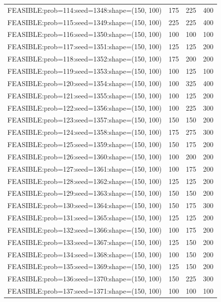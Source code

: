 \begin{longtable}{lccc}
FEASIBLE:prob=114:seed=1348:shape=(150, 100) &  175 &   225 &    400 \\
FEASIBLE:prob=115:seed=1349:shape=(150, 100) &  225 &   225 &    400 \\
FEASIBLE:prob=116:seed=1350:shape=(150, 100) &  100 &   100 &    100 \\
FEASIBLE:prob=117:seed=1351:shape=(150, 100) &  125 &   125 &    200 \\
FEASIBLE:prob=118:seed=1352:shape=(150, 100) &  175 &   200 &    200 \\
FEASIBLE:prob=119:seed=1353:shape=(150, 100) &  100 &   125 &    100 \\
FEASIBLE:prob=120:seed=1354:shape=(150, 100) &  100 &   325 &    400 \\
FEASIBLE:prob=121:seed=1355:shape=(150, 100) &  100 &   125 &    200 \\
FEASIBLE:prob=122:seed=1356:shape=(150, 100) &  100 &   225 &    300 \\
FEASIBLE:prob=123:seed=1357:shape=(150, 100) &  150 &   150 &    200 \\
FEASIBLE:prob=124:seed=1358:shape=(150, 100) &  175 &   275 &    300 \\
FEASIBLE:prob=125:seed=1359:shape=(150, 100) &  150 &   175 &    200 \\
FEASIBLE:prob=126:seed=1360:shape=(150, 100) &  100 &   200 &    200 \\
FEASIBLE:prob=127:seed=1361:shape=(150, 100) &  100 &   175 &    200 \\
FEASIBLE:prob=128:seed=1362:shape=(150, 100) &  125 &   125 &    200 \\
FEASIBLE:prob=129:seed=1363:shape=(150, 100) &  150 &   150 &    200 \\
FEASIBLE:prob=130:seed=1364:shape=(150, 100) &  150 &   175 &    300 \\
FEASIBLE:prob=131:seed=1365:shape=(150, 100) &  125 &   125 &    200 \\
FEASIBLE:prob=132:seed=1366:shape=(150, 100) &  100 &   175 &    200 \\
FEASIBLE:prob=133:seed=1367:shape=(150, 100) &  125 &   150 &    200 \\
FEASIBLE:prob=134:seed=1368:shape=(150, 100) &  100 &   150 &    200 \\
FEASIBLE:prob=135:seed=1369:shape=(150, 100) &  125 &   150 &    200 \\
FEASIBLE:prob=136:seed=1370:shape=(150, 100) &  150 &   225 &    300 \\
FEASIBLE:prob=137:seed=1371:shape=(150, 100) &  100 &   100 &    100 \\

\end{longtable}

